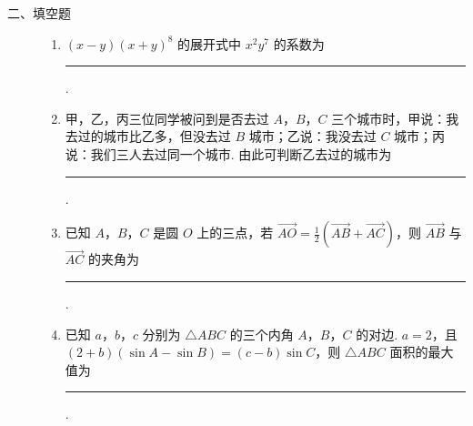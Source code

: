 \begin{description}

    \item[二、填空题]

    \begin{enumerate}[leftmargin=5pt]

      \addtocounter{enumi}{+12}

        \item \((x - y)(x + y)^8\) 的展开式中 \(x^{2}y^{7}\) 的系数为\rule[-0.3ex]{3em}{0.4pt}.

        \item 甲，乙，丙三位同学被问到是否去过 \(A\)，\(B\)，\(C\) 三个城市时，甲说：我去过的城市比乙多，但没去过 \(B\) 城市；乙说：我没去过 \(C\) 城市；丙说：我们三人去过同一个城市. 由此可判断乙去过的城市为\rule[-0.3ex]{3em}{0.4pt}.

        \item 已知 \(A\)，\(B\)，\(C\) 是圆 \(O\) 上的三点，若 \( \overrightarrow{AO} = \frac{1}{2}\left(\overrightarrow{AB} + \overrightarrow{AC}\right) \)，则 \( \overrightarrow{AB} \) 与 \( \overrightarrow{AC} \) 的夹角为\rule[-0.3ex]{3em}{0.4pt}.

        \item 已知 \(a\)，\(b\)，\(c\) 分别为 \(\triangle ABC\) 的三个内角 \(A\)，\(B\)，\(C\) 的对边. \(a = 2\)，且 \((2 + b)(\sin A - \sin B) = (c - b)\sin C\)，则 \(\triangle ABC\) 面积的最大值为\rule[-0.3ex]{3em}{0.4pt}.

    \end{enumerate}

\end{description}

